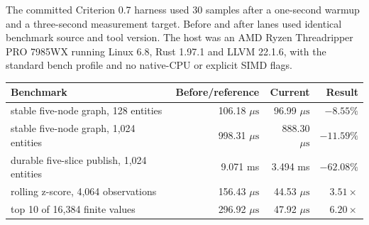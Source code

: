 \documentclass{strategynet-journal}
\begin{document}
The committed Criterion 0.7 harness \cite{criterion} used 30 samples after a
one-second warmup and a three-second measurement target.  Before and after
lanes used identical benchmark source and tool version.  The host was an AMD
Ryzen Threadripper PRO 7985WX running Linux 6.8, Rust 1.97.1 and LLVM 22.1.6,
with the standard bench profile and no native-CPU or explicit SIMD flags.

\begin{center}
\small
\begin{tabularx}{\textwidth}{@{}X r r r@{}}
\toprule
Benchmark & Before/reference & Current & Result \\
\midrule
stable five-node graph, 128 entities & 106.18 \(\mu\mathrm{s}\) & 96.99 \(\mu\mathrm{s}\) & \(-8.55\%\) \\
stable five-node graph, 1,024 entities & 998.31 \(\mu\mathrm{s}\) & 888.30 \(\mu\mathrm{s}\) & \(-11.59\%\) \\
durable five-slice publish, 1,024 entities & 9.071 ms & 3.494 ms & \(-62.08\%\) \\
rolling z-score, 4,064 observations & 156.43 \(\mu\mathrm{s}\) & 44.53 \(\mu\mathrm{s}\) & \(3.51\times\) \\
top 10 of 16,384 finite values & 296.92 \(\mu\mathrm{s}\) & 47.92 \(\mu\mathrm{s}\) & \(6.20\times\) \\
\bottomrule
\end{tabularx}
\end{center}
\end{document}
